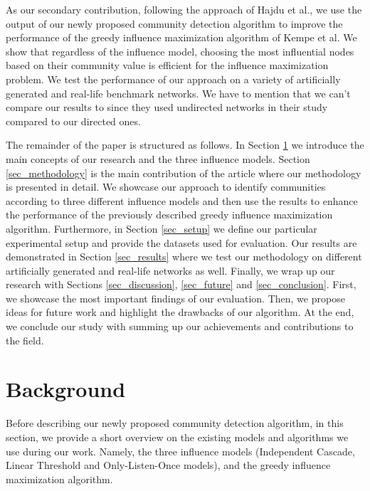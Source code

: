 \documentclass[pdflatex,sn-mathphys-ay]{sn-jnl}
\begin{document}
As our secondary contribution, following the approach of Hajdu et al., we use the output of our newly proposed community detection algorithm to improve the performance of the greedy influence maximization algorithm of Kempe et al. We show that regardless of the influence model, choosing the most influential nodes based on their community value is efficient for the influence maximization problem. We test the performance of our approach on a variety of artificially generated and real-life benchmark networks. We have to mention that we can't compare our results to \citep{evaluating} since they used undirected networks in their study compared to our directed ones.

The remainder of the paper is structured as follows. In Section \ref{sec_background} we introduce the main concepts of our research and the three influence models. Section \ref{sec_methodology} is the main contribution of the article where our methodology is presented in detail. We showcase our approach to identify communities according to three different influence models and then use the results to enhance the performance of the previously described greedy influence maximization algorithm. Furthermore, in Section \ref{sec_setup} we define our particular experimental setup and provide the datasets used for evaluation. Our results are demonstrated in Section \ref{sec_results} where we test our methodology on different artificially generated and real-life networks as well. Finally, we wrap up our research with Sections \ref{sec_discussion}, \ref{sec_future} and \ref{sec_conclusion}. First, we showcase the most important findings of our evaluation. Then, we propose ideas for future work and highlight the drawbacks of our algorithm. At the end, we conclude our study with summing up our achievements and contributions to the field.


\section{Background}\label{sec_background}

Before describing our newly proposed community detection algorithm, in this section, we provide a short overview on the existing models and algorithms we use during our work. Namely, the three influence models (Independent Cascade, Linear Threshold and Only-Listen-Once models), and the greedy influence maximization algorithm.
\end{document}
